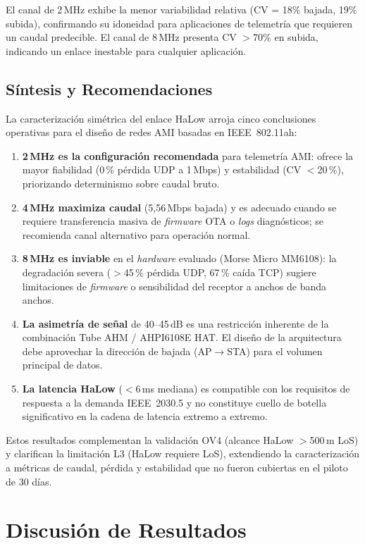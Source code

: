 El canal de 2\,MHz exhibe la menor variabilidad relativa (CV = 18\% bajada, 19\% subida), confirmando su idoneidad para aplicaciones de telemetría que requieren un caudal predecible. El canal de 8\,MHz presenta CV $>$70\% en subida, indicando un enlace inestable para cualquier aplicación.


\subsection{Síntesis y Recomendaciones}
\label{sec:resultados-halow-sintesis}

La caracterización simétrica del enlace HaLow arroja cinco conclusiones operativas para el diseño de redes AMI basadas en IEEE~802.11ah:

\begin{enumerate}
    \item \textbf{2\,MHz es la configuración recomendada} para telemetría AMI: ofrece la mayor fiabilidad (0\,\% pérdida UDP a 1\,Mbps) y estabilidad (CV $<$20\,\%), priorizando determinismo sobre caudal bruto.
    \item \textbf{4\,MHz maximiza caudal} (5,56\,Mbps bajada) y es adecuado cuando se requiere transferencia masiva de \emph{firmware} OTA o \emph{logs} diagnósticos; se recomienda canal alternativo para operación normal.
    \item \textbf{8\,MHz es inviable} en el \emph{hardware} evaluado (Morse Micro MM6108): la degradación severa ($>$45\,\% pérdida UDP, 67\,\% caída TCP) sugiere limitaciones de \emph{firmware} o sensibilidad del receptor a anchos de banda anchos.
    \item \textbf{La asimetría de señal} de 40--45\,dB es una restricción inherente de la combinación Tube AHM / AHPI6108E HAT. El diseño de la arquitectura debe aprovechar la dirección de bajada (AP$\rightarrow$STA) para el volumen principal de datos.
    \item \textbf{La latencia HaLow} ($<$6\,ms mediana) es compatible con los requisitos de respuesta a la demanda IEEE~2030.5 y no constituye cuello de botella significativo en la cadena de latencia extremo a extremo.
\end{enumerate}

Estos resultados complementan la validación OV4 (alcance HaLow $>$500\,m LoS) y clarifican la limitación L3 (HaLow requiere LoS), extendiendo la caracterización a métricas de caudal, pérdida y estabilidad que no fueron cubiertas en el piloto de 30 días.


\section{Discusión de Resultados}
\label{sec:resultados-discusion}

